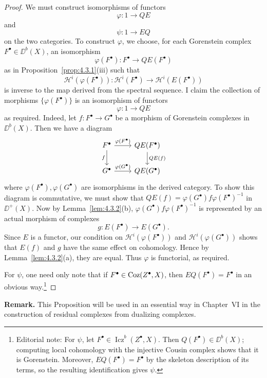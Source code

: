 \begin{proof}
We must construct isomorphisms of functors
\[
\varphi\colon 1\longrightarrow QE
\]
and
\[
\psi\colon 1\longrightarrow EQ
\]
on the two categories. To construct $\varphi$, we choose, for each Gorenstein complex $F^\bullet\in\DD^b(X)$, an isomorphism
\[
\varphi(F^\bullet)\colon F^\bullet\longrightarrow QE(F^\bullet)
\]
as in Proposition~\ref{prop:4.3.1}(iii) such that
\[
\mathcal{H}^{i}(\varphi(F^\bullet))\colon \mathcal{H}^{i}(F^\bullet)\longrightarrow \mathcal{H}^{i}(E(F^\bullet))
\]
is inverse to the map derived from the spectral sequence. I claim the collection of morphisms $\{\varphi(F^\bullet)\}$ is an isomorphism of functors
\[
\varphi\colon 1\longrightarrow QE
\]
as required. Indeed, let $f\colon F^\bullet\to G^\bullet$ be a morphism of Gorenstein complexes in $\DD^b(X)$. Then we have a diagram
\[
\begin{tikzcd}
F^\bullet \arrow[r, "\varphi(F^\bullet)"] \arrow[d, "f"'] & QE(F^\bullet) \arrow[d, "QE(f)"] \\
G^\bullet \arrow[r, "\varphi(G^\bullet)"] & QE(G^\bullet)
\end{tikzcd}
\]
where $\varphi(F^\bullet),\varphi(G^\bullet)$ are isomorphisms in the derived category. To show this diagram is commutative, we must show that $QE(f)=\varphi(G^\bullet)f\varphi(F^\bullet)^{-1}$ in $\DD^+(X)$. Now by Lemma~\ref{lem:4.3.2}(b), $\varphi(G^\bullet)f\varphi(F^\bullet)^{-1}$ is represented by an actual morphism of complexes
\[
g\colon E(F^\bullet)\longrightarrow E(G^\bullet).
\]
Since $E$ is a functor, our condition on $\mathcal{H}^{i}(\varphi(F^\bullet))$ and $\mathcal{H}^{i}(\varphi(G^\bullet))$ shows that $E(f)$ and $g$ have the same effect on cohomology. Hence by Lemma~\ref{lem:4.3.2}(a), they are equal. Thus $\varphi$ is functorial, as required.

For $\psi$, one need only note that if $F^\bullet\in\operatorname{Coz}(Z^\bullet,X)$, then $EQ(F^\bullet)=F^\bullet$ in an obvious way.\footnote{Editorial note: For $\psi$, let $F^\bullet\in\operatorname{Icz}^{b}(Z^\bullet,X)$. Then $Q(F^\bullet)\in\DD^b(X)$; computing local cohomology with the injective Cousin complex shows that it is Gorenstein. Moreover, $EQ(F^\bullet)=F^\bullet$ by the skeleton description of its terms, so the resulting identification gives $\psi$.}

\end{proof}

\par\medskip\noindent\textbf{Remark.}
This Proposition will be used in an essential way in Chapter~VI in the construction of residual complexes from dualizing complexes.
\par\medskip
\par
\endgroup
